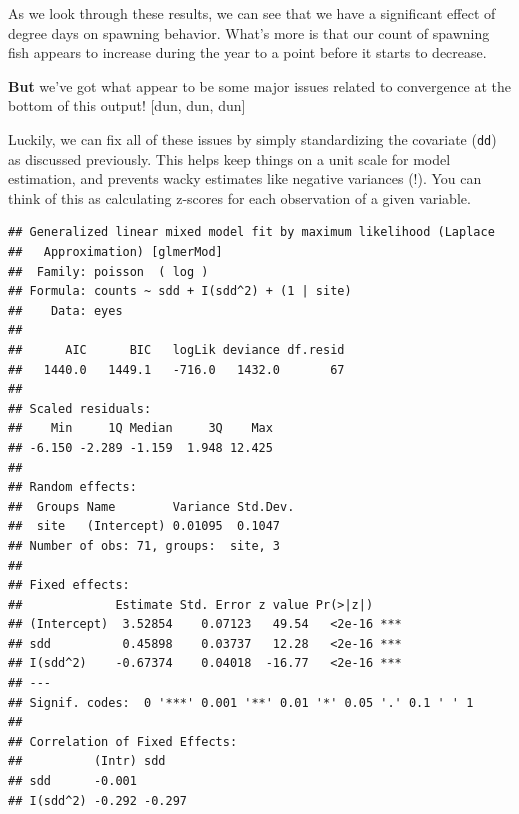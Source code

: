 \documentclass[
]{book}
\newenvironment{Shaded}{\begin{snugshade}}{\end{snugshade}}
\newcommand{\CommentTok}[1]{\textcolor[rgb]{0.56,0.35,0.01}{\textit{#1}}}
\newcommand{\DataTypeTok}[1]{\textcolor[rgb]{0.13,0.29,0.53}{#1}}
\newcommand{\DecValTok}[1]{\textcolor[rgb]{0.00,0.00,0.81}{#1}}
\newcommand{\KeywordTok}[1]{\textcolor[rgb]{0.13,0.29,0.53}{\textbf{#1}}}
\newcommand{\NormalTok}[1]{#1}
\newcommand{\OperatorTok}[1]{\textcolor[rgb]{0.81,0.36,0.00}{\textbf{#1}}}
\newcommand{\StringTok}[1]{\textcolor[rgb]{0.31,0.60,0.02}{#1}}
\begin{document}
As we look through these results, we can see that we have a significant effect of degree days on spawning behavior. What's more is that our count of spawning fish appears to increase during the year to a point before it starts to decrease.

\textbf{But} we've got what appear to be some major issues related to convergence at the bottom of this output! {[}dun, dun, dun{]}

Luckily, we can fix all of these issues by simply standardizing the covariate (\texttt{dd}) as discussed previously. This helps keep things on a unit scale for model estimation, and prevents wacky estimates like negative variances (!). You can think of this as calculating z-scores for each observation of a given variable.

\begin{Shaded}
\end{Shaded}

\begin{verbatim}
## Generalized linear mixed model fit by maximum likelihood (Laplace
##   Approximation) [glmerMod]
##  Family: poisson  ( log )
## Formula: counts ~ sdd + I(sdd^2) + (1 | site)
##    Data: eyes
## 
##      AIC      BIC   logLik deviance df.resid 
##   1440.0   1449.1   -716.0   1432.0       67 
## 
## Scaled residuals: 
##    Min     1Q Median     3Q    Max 
## -6.150 -2.289 -1.159  1.948 12.425 
## 
## Random effects:
##  Groups Name        Variance Std.Dev.
##  site   (Intercept) 0.01095  0.1047  
## Number of obs: 71, groups:  site, 3
## 
## Fixed effects:
##             Estimate Std. Error z value Pr(>|z|)    
## (Intercept)  3.52854    0.07123   49.54   <2e-16 ***
## sdd          0.45898    0.03737   12.28   <2e-16 ***
## I(sdd^2)    -0.67374    0.04018  -16.77   <2e-16 ***
## ---
## Signif. codes:  0 '***' 0.001 '**' 0.01 '*' 0.05 '.' 0.1 ' ' 1
## 
## Correlation of Fixed Effects:
##          (Intr) sdd   
## sdd      -0.001       
## I(sdd^2) -0.292 -0.297
\end{verbatim}
\end{document}
